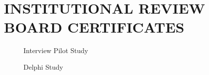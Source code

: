 %
%
%
%	 
%



\chapter{\uppercase{Institutional Review Board Certificates}}\label{appendix:A}

\begin{figure}[h]
\centering
{}
\caption{Interview Pilot Study}
\end{figure}

\pagebreak{}

\begin{figure}[h]
\centering
\caption{Delphi Study}
\end{figure}


